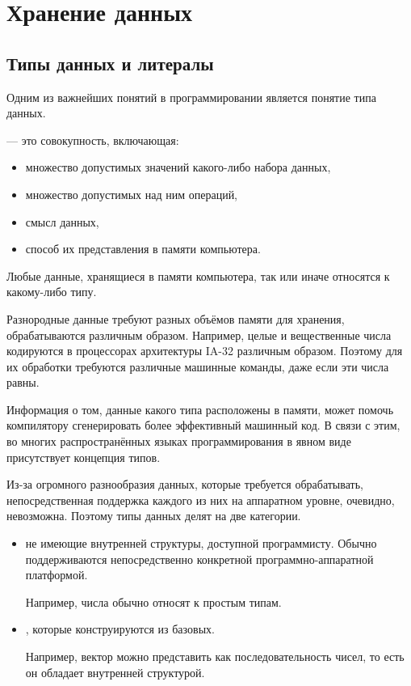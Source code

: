 \chapter{Хранение данных}

\section{Типы данных и литералы}


Одним из важнейших понятий в программировании является понятие типа
данных.

\begin{defn}
   — это совокупность, включающая:
  \begin{itemize}
    \item множество допустимых значений какого-либо набора данных,
    \item множество допустимых над ним операций,
    \item смысл данных,
    \item способ их представления в памяти компьютера.
  \end{itemize}
\end{defn}

Любые данные, хранящиеся в памяти компьютера, так или иначе относятся
к какому-либо типу.

Разнородные данные требуют разных объёмов памяти для хранения,
обрабатываются различным образом. Например, целые и вещественные числа
кодируются в процессорах архитектуры IA-32 различным образом. Поэтому
для их обработки требуются различные машинные команды, даже если эти
числа равны.

Информация о том, данные какого типа расположены в памяти, может
помочь компилятору сгенерировать более эффективный машинный код. В
связи с этим, во многих распространённых языках программирования в
явном виде присутствует концепция типов.


Из-за огромного разнообразия данных, которые требуется обрабатывать,
непосредственная поддержка каждого из них на аппаратном уровне,
очевидно, невозможна. Поэтому типы данных делят на две категории.

\begin{itemize}
\item {} не имеющие внутренней
  структуры, доступной программисту. Обычно поддерживаются
  непосредственно конкретной программно-аппаратной платформой.

  Например, числа обычно относят к простым типам.

\item {}, которые конструируются
  из базовых.

  Например, вектор можно представить как последовательность чисел, то
  есть он обладает внутренней структурой.
\end{itemize}

